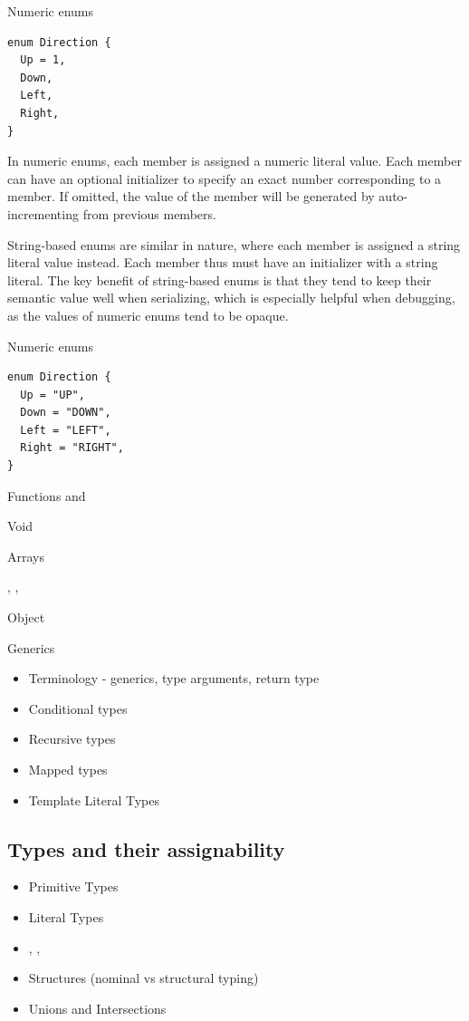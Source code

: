 \begin{listing}[h]
  \caption{Numeric enums}
  \begin{verbatim}
enum Direction {
  Up = 1,
  Down,
  Left,
  Right,
}
\end{verbatim}
\end{listing}

In numeric enums, each member is assigned a numeric literal value. Each member can have an optional initializer to specify an exact number corresponding to a member. If omitted, the value of the member will be generated by auto-incrementing from previous members.

String-based enums are similar in nature, where each member is assigned a string literal value instead. Each member thus must have an initializer with a string literal. The key benefit of string-based enums is that they tend to keep their semantic value well when serializing, which is especially helpful when debugging, as the values of numeric enums tend to be opaque.

\begin{listing}[h]
  \caption{Numeric enums}
  \begin{verbatim}
enum Direction {
  Up = "UP",
  Down = "DOWN",
  Left = "LEFT",
  Right = "RIGHT",
}
\end{verbatim}
\end{listing}

Functions and 

Void

Arrays

, , 

Object

Generics

\begin{itemize}
  \item Terminology - generics, type arguments, return type
  \item Conditional types
  \item Recursive types
  \item Mapped types
  \item Template Literal Types
\end{itemize}

\subsection{Types and their assignability}

\begin{itemize}
  \item Primitive Types
  \item Literal Types
  \item {}, , 
  \item Structures (nominal vs structural typing)
  \item Unions and Intersections
\end{itemize}

